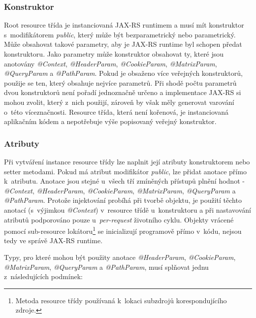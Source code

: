 \documentclass[11pt,twoside,a4paper]{book}
\begin{document}
\subsubsection{Konstruktor}

Root resource třída je instanciovaná JAX-RS runtimem a musí mít konstruktor
s~modifikátorem {\em public}, který může být bezparametrický nebo parametrický.
Může obsahovat takové parametry, aby je JAX-RS runtime byl schopen předat konstruktoru. Jako parametry
může konstruktor obsahovat ty, které jsou anotovány {\em @Context}, {\em @HeaderParam},
{\em @CookieParam}, {\em @MatrixParam}, {\em @QueryParam} a {\em @PathParam}. Pokud je obsaženo více
veřejných konstruktorů, použije se ten, který obsahuje nejvíce parametrů. Při
shodě počtu parametrů dvou konstruktorů není pořadí jednoznačně určeno a implementace JAX-RS si
mohou zvolit, který z~nich použijí, zároveň by však měly generovat varování
o~této víceznačnosti. Resource třída, která není kořenová, je instanciovaná
aplikačním kódem a nepotřebuje výše popisovaný veřejný konstruktor.

\subsubsection{Atributy}
\label{ch:atributy}

Při vytváření instance resource třídy lze naplnit její atributy konstruktorem nebo setter
metodami. Pokud má atribut modifikátor {\em public}, lze přidat anotace přímo
k~atributu. Anotace jsou stejné u~všech tří zmíněných přístupů plnění hodnot - {\em @Context}, {\em @HeaderParam},
{\em @CookieParam}, {\em @MatrixParam}, {\em @QueryParam} a {\em @PathParam}. Protože injektování probíhá
při tvorbě objektu, je použití těchto anotací (s~výjimkou {\em @Context})
v~resource třídě u~konstruktoru a při nastavování atributů podporováno pouze u~{\em per-request}
životního cyklu. Objekty vrácené pomocí sub-resource lokátoru\footnote{Metoda
resource třídy používaná k~lokaci subzdrojů korespondujícího zdroje.} se
inicializují programově přímo v~kódu, nejsou tedy ve správě JAX-RS runtime.

Typy, pro které mohou být použity anotace {\em @HeaderParam}, {\em @CookieParam}, {\em @MatrixParam},
{\em @QueryParam} a {\em @PathParam}, musí splňovat jednu z~následujících podmínek:
\end{document}
